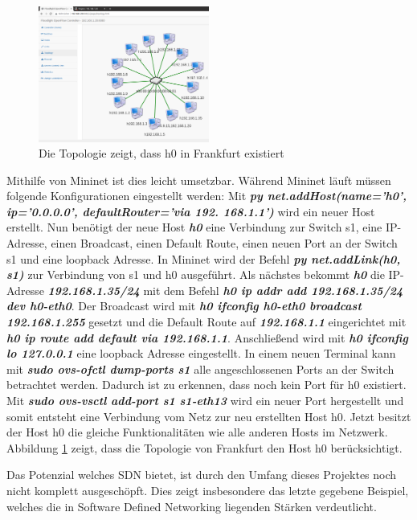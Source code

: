 \documentclass[fontsize=12pt,paper=a4,open=any,parskip=half,
  twoside=false,toc=listof,toc=bibliography,fleqn,leqno,
  captions=nooneline,captions=tableabove,british]{scrbook}
\begin{document}
{\begin{figure}
	\vspace{-\baselineskip}
	\centering
	\includegraphics[width=0.5\textwidth]{Bilder/neuetopo}
	\caption{Die Topologie zeigt, dass h0 in Frankfurt existiert}
	\label{neutopo}
\end{figure}
Mithilfe von Mininet ist dies leicht umsetzbar. Während Mininet läuft müssen folgende Konfigurationen eingestellt werden: Mit \textit{\textbf{py net.addHost(name='h0', ip='0.0.0.0', defaultRouter='via 192. 168.1.1')}} wird ein neuer Host erstellt. Nun benötigt der neue Host \textit{\textbf{h0}} eine Verbindung zur Switch s1, eine IP-Adresse, einen Broadcast, einen Default Route, einen neuen Port an der Switch s1 und eine loopback Adresse. In Mininet wird der Befehl \textit{\textbf{py net.addLink(h0, s1)}} zur Verbindung von s1 und h0 ausgeführt. Als nächstes bekommt \textit{\textbf{h0}} die IP-Adresse \textit{\textbf{192.168.1.35/24}} mit dem Befehl 
\textit{\textbf{h0 ip addr add 192.168.1.35/24 dev h0-eth0}}. Der Broadcast wird mit \textit{\textbf{h0 ifconfig h0-eth0 broadcast 192.168.1.255}} gesetzt und die Default Route auf \textit{\textbf{192.168.1.1}} eingerichtet mit \textit{\textbf{h0 ip route add default via 192.168.1.1}}. Anschließend wird mit \textit{\textbf{h0 ifconfig lo 127.0.0.1}} eine loopback Adresse eingestellt. In einem neuen Terminal  kann mit  \textit{\textbf{sudo ovs-ofctl dump-ports s1}} alle angeschlossenen Ports an der Switch betrachtet werden. Dadurch ist zu erkennen, dass noch kein Port für h0 existiert. Mit \textit{\textbf{sudo ovs-vsctl add-port s1 s1-eth13}} wird ein neuer Port hergestellt und somit entsteht eine Verbindung vom Netz zur neu erstellten Host h0. Jetzt besitzt der Host h0 die gleiche Funktionalitäten wie alle anderen Hosts im Netzwerk. Abbildung \ref{neutopo} zeigt, dass die Topologie von Frankfurt den Host h0 berücksichtigt. \par

Das Potenzial welches SDN bietet, ist durch den Umfang dieses Projektes noch nicht komplett ausgeschöpft. Dies zeigt insbesondere das letzte gegebene Beispiel, welches die in Software Defined Networking liegenden Stärken verdeutlicht. 

}
\end{document}
